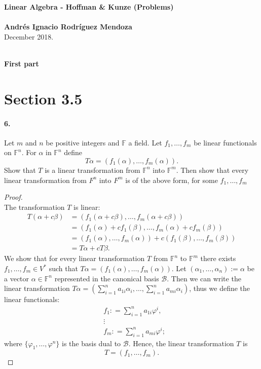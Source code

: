 \documentclass{article}
\theoremstyle{plain}
\theoremstyle{definition}
\theoremstyle{remark}
\newcommand{\ba}{\mathscr{B}}
\newcommand{\Fi}{\mathbb{F}}
\begin{document}
$ $\\
  \textbf{\Large Linear Algebra - Hoffman \& Kunze  (Problems)}\\\\
  \textbf{\large Andr\'es Ignacio Rodr\'iguez Mendoza}\\
  December 2018.
  \\\\
  \begin{center}
    {\textbf{\LARGE First part}}
  \end{center}
  \section*{Section 3.5}

    \paragraph{6.} Let $m$ and $n$ be positive integers and $\Fi$ a field. Let $f_1,\ldots,f_m$ be linear functionals on $\Fi^n$. For $\alpha$ in $\Fi^n$ define
    $$T\alpha= (f_1(\alpha),\ldots,f_m(\alpha)).$$
    Show that $T$ is a linear transformation from $\Fi^n$ into $\Fi^m$. Then show that every linear transformation from $F^n$ into $F^m$ is of the above form, for some $f_1,\ldots,f_m$
    \begin{proof}$ $\\
      The transformation $T$ is linear:
      \begin{align*}
        T (\alpha + c \beta)  & = (f_1(\alpha + c\beta),\ldots,f_m (\alpha + c\beta))\\
                              & = (f_1(\alpha) + cf_1(\beta),\ldots,f_m (\alpha) + cf_m(\beta))\\
                              & = (f_1(\alpha),\ldots,f_m (\alpha)) + c(f_1(\beta),\ldots,f_m(\beta))\\
                              & = T\alpha + cT\beta.
      \end{align*}
      We show that for every linear transformation $T$ from $\Fi^n$ to $\Fi^m$ there exists $f_1,\ldots,f_m \in V^*$ such that $T\alpha= (f_1(\alpha),\ldots,f_m(\alpha)).$ Let $(\alpha_1,\ldots,\alpha_n):=\alpha$ be a vector $\alpha\in \Fi^n$ represented in the canonical basis $\ba$. Then we can write the linear transformation
      $T\alpha = \left(\sum_{i=1}^na_{1i}\alpha_i,\ldots,\sum_{i=1}^na_{mi}\alpha_i \right)$, thus we define the linear functionals:
      \begin{align*}
        &f_1 : = \sum_{i=1}^na_{1i} \varphi^i,\\
        &\vdots \\
        &f_m : = \sum_{i=1}^na_{mi} \varphi^i;
      \end{align*}
      where $\{ \varphi_1,\ldots,\varphi^n\}$ is the basis dual to $\ba$. Hence, the linear transformation $T$ is
      $$T = (f_1 ,\ldots,f_m).$$
    \end{proof}
\end{document}
